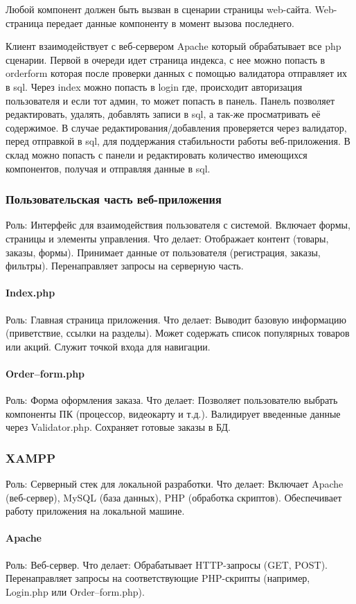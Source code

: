 Любой компонент должен быть вызван в сценарии страницы web-сайта. Web-страница передает данные компоненту в момент вызова последнего.

Клиент взаимодействует с веб-сервером Apache который обрабатывает все php сценарии. Первой в очереди идет страница индекса, с нее можно попасть в orderform которая после проверки данных с помощью валидатора отправляет их в sql. Через index можно попасть в login где, происходит авторизация пользователя и если тот админ, то может попасть в панель. Панель позволяет редактировать, удалять, добавлять записи в sql, а так-же просматривать её содержимое. В случае редактирования/добавления проверяется через валидатор, перед отправкой в sql, для поддержания стабильности работы веб-приложения. В склад можно попасть с панели и редактировать количество имеющихся компонентов, получая и отправляя данные в sql.
\newpage
\subsubsection{Пользовательская часть веб-приложения}
Роль:
Интерфейс для взаимодействия пользователя с системой. Включает формы, страницы и элементы управления.
Что делает:
Отображает контент (товары, заказы, формы).
Принимает данные от пользователя (регистрация, заказы, фильтры).
Перенаправляет запросы на серверную часть.
\paragraph{Index.php} 
Роль:
Главная страница приложения.
Что делает:
Выводит базовую информацию (приветствие, ссылки на разделы).
Может содержать список популярных товаров или акций.
Служит точкой входа для навигации.
\paragraph{Order--form.php} 
Роль:
Форма оформления заказа.
Что делает:
Позволяет пользователю выбрать компоненты ПК (процессор, видеокарту и т.д.).
Валидирует введенные данные через Validator.php.
Сохраняет готовые заказы в БД.
\subsubsection{XAMPP}
Роль:
Серверный стек для локальной разработки.
Что делает:
Включает Apache (веб-сервер), MySQL (база данных), PHP (обработка скриптов).
Обеспечивает работу приложения на локальной машине.
\paragraph{Apache} 
Роль:
Веб-сервер.
Что делает:
Обрабатывает HTTP-запросы (GET, POST).
Перенаправляет запросы на соответствующие PHP-скрипты (например, Login.php или Order--form.php).
